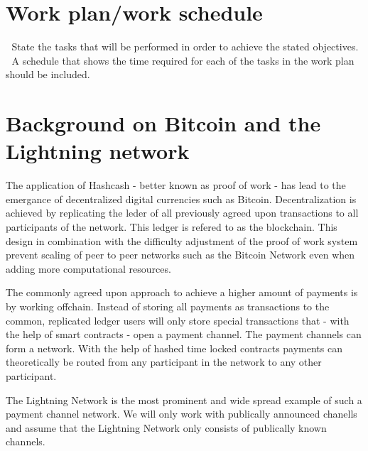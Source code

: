 \documentclass[a4paper]{paper}
\begin{document}
\section{Work plan/work schedule}
 State the tasks that will be performed in order to achieve the stated objectives.
 A schedule that shows the time required for each of the tasks in the work plan should be
included.




\appendix
\section{Background on Bitcoin and the Lightning network}
The application of Hashcash \cite{back2002hashcash} - better known as proof of work -  has lead to the emergance of decentralized digital currencies such as Bitcoin\cite{nakamoto2008bitcoin}.
Decentralization is achieved by replicating the leder of all previously agreed upon transactions to all participants of the network.
This ledger is refered to as the blockchain.
This design in combination with the difficulty adjustment of the proof of work system prevent scaling of peer to peer networks such as the Bitcoin Network even when adding more computational resources.

The commonly agreed upon approach to achieve a higher amount of payments is by working offchain.
Instead of storing all payments as transactions to the common, replicated ledger users will only store special transactions that - with the help of smart contracts - open a payment channel.
The payment channels can form a network.
With the help of hashed time locked contracts payments can theoretically be routed from any participant in the network to any other participant. 

The Lightning Network is the most prominent and wide spread example of such a payment channel network.
We will only work with publically announced chanells and assume that the Lightning Network only consists of publically known channels.
\end{document}
